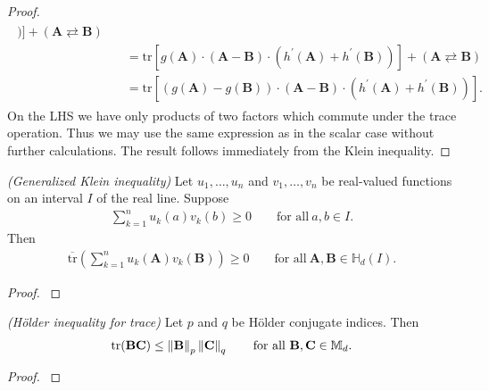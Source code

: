\begin{proof}
\begin{align}
\begin{split}
    )
  ]
  +
  (\mathbf{A} \rightleftarrows \mathbf{B})
  \\
  &\quad=
  \mathrm{tr}
  [
    g(\mathbf{A})
    \cdot
    (
    \mathbf{A}
    -
    \mathbf{B}
    )
    \cdot
    (
    h^{'}(\mathbf{A})
    +
    h^{'}(\mathbf{B})
    )
  ]
  +
  (\mathbf{A} \rightleftarrows \mathbf{B})
  \\
  &\quad=
  \mathrm{tr}
  [
  (
    g(\mathbf{A})
    -
    g(\mathbf{B})
  )
    \cdot
    (
    \mathbf{A}
    -
    \mathbf{B}
    )
    \cdot
    (
    h^{'}(\mathbf{A})
    +
    h^{'}(\mathbf{B})
    )
  ].
    \end{split}
  \end{align}
  On the LHS we have only products of two factors which commute under the trace operation. Thus we may use the same expression as in the scalar case without further calculations.
  The result follows immediately from the Klein inequality.
\end{proof}

\begin{proposition}
  \emph{(Generalized Klein inequality)}
  Let 
  $
    u_1, \ldots, u_n
  $
  and
  $
    v_1, \ldots, v_n
  $
  be real-valued functions on an interval $I$
  of the real line.
  Suppose
  \begin{gather}
    \sum_{k=1}^{n}
    u_k(a)
    v_k(b)
    \ge
    0
    \qquad
    \text{for all}
    \ 
    a,b \in I
    .
  \end{gather}
  Then
  \begin{gather}
    \overline{\mathrm{tr}}
    \left( 
    \sum_{k=1}^{n}
    u_k(\mathbf{A})
    v_k(\mathbf{B})
    \right)
    \ge 0
    \qquad
    \text{for all}
    \ 
    \mathbf{A}, \mathbf{B} \in \mathbb{H}_d(I)
    .
  \end{gather}
\end{proposition}
\begin{proof}
  \emph{\cite[Proposition~3]{Petz1994}}
\end{proof}




\begin{proposition}
  \emph{(Hölder inequality for trace)}
  Let 
  $p$ and $q$
  be Hölder conjugate indices.
  Then
  \begin{gather}
    \mathrm{tr}
    (
    \mathbf{BC}
    )
    \le
    \norm{\mathbf{B}}_p
    \norm{\mathbf{C}}_q
    \qquad
    \text{for all}
    \ 
    \mathbf{B}
    ,
    \mathbf{C}
    \in 
    \mathbb{M}_d
    .
  \end{gather}
\end{proposition}
\begin{proof}
  \cite[Corollary~IV.2.6]{Bhatia1997}
\end{proof}
